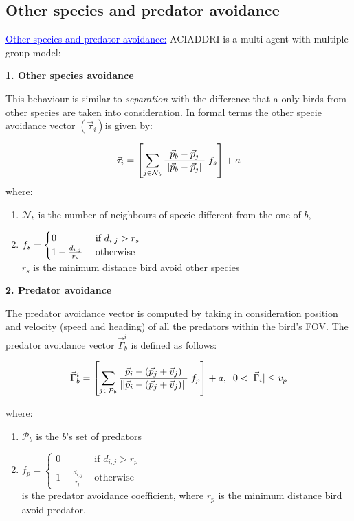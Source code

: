 \documentclass{beamer}
\begin{document}
\subsection{Other species and predator avoidance}
\begin{frame}
\textcolor{blue}{\underline{Other species and predator avoidance:}}
\textsc{ACIADDRI} is a multi-agent with multiple group model:


 \textbf{1. Other species avoidance}
	
	This behaviour is similar to \textit{separation}  with the difference that a only birds from other species are taken into consideration. In formal terms the other specie avoidance vector  $(\vec{\tau}_i) $is given by:
	
	\begin{equation}
	\vec{\tau}_i = 
		 \left[\sum_{j \in \mathcal{N}_b}{\frac{\vec{p}_b -\vec{p}_j}{||\vec{p}_b - \vec{p}_j||}} \;f_s\right] + a  \notag
	\end{equation}
	where:
	
	\begin{enumerate}
	\item \(\mathcal{N}_b\) is the number of neighbours of specie different from the one of $b$,
	
	\item $
		f_s = \begin{cases}
		0 &\mbox{ if }  d_{i,j} > r_s\\
		1 - \frac{d_{i,j}}{r_s} &\mbox{ otherwise} \notag
		\end{cases}$ \hfill \\
		$ r_s$ is the minimum distance bird avoid other species
	\end{enumerate}
\end{frame}

\begin{frame}
\textbf{2. Predator avoidance}

The predator avoidance vector is computed by taking in consideration position and velocity (speed and heading) of all the  predators within the bird's FOV.
The predator avoidance vector $\vec{\Gamma}_b^i$ is defined as follows:
	
	\begin{align}
	\vec{\Gamma}_b^i = \left[\sum_{j \in \mathcal{P}_b }{\frac{\vec{p}_i -
	(\vec{p}_j+\vec{v}_j)}{||\vec{p}_i - (\vec{p}_j+\vec{v}_j)||}} \;f_{p}\right] +
	a, \;\;0 < |\vec{\Gamma}_i| \leq v_p \notag
	\end{align}
	
	where:
	
	\begin{enumerate}
	\item \(\mathcal{P}_b\) is the $b$'s set of predators
	\item $	f_{p} = \begin{cases}
		0 &\mbox{ if }  d_{i,j} > r_p\\
		1 - \frac{d_{i,j}}{r_p} & \mbox{ otherwise}
		\end{cases}
	$ \hfill \\
	 is the predator avoidance coefficient, where $r_p$ is the  minimum distance bird avoid predator.
	\end{enumerate}
\end{frame}
\end{document}
